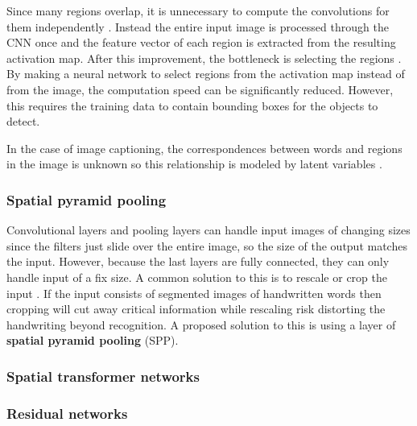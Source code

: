 Since many regions overlap, it is unnecessary to compute the convolutions for them independently \cite{FastRCNN}. Instead the entire input image is processed through the CNN once and the feature vector of each region is extracted from the resulting activation map. After this improvement, the bottleneck is selecting the regions \cite{FasterRCNN}. By making a neural network to select regions from the activation map instead of from the image, the computation speed can be significantly reduced. However, this requires the training data to contain bounding boxes for the objects to detect.

In the case of image captioning, the correspondences between words and regions in the image is unknown so this relationship is modeled by latent variables \cite{VisualSemanticAlignment}.

\subsubsection{Spatial pyramid pooling}

Convolutional layers and pooling layers can handle input images of changing sizes since the filters just slide over the entire image, so the size of the output matches the input.
However, because the last layers are fully connected, they can only handle input of a fix size. A common solution to this is to rescale or crop the input \cite{FornesCnnCategorization}. If the input consists of segmented images of handwritten words then cropping will cut away critical information while rescaling risk distorting the handwriting beyond recognition. A proposed solution to this is using a layer of \textbf{spatial pyramid pooling} (SPP).

\subsubsection{Spatial transformer networks}


\subsubsection{Residual networks}

